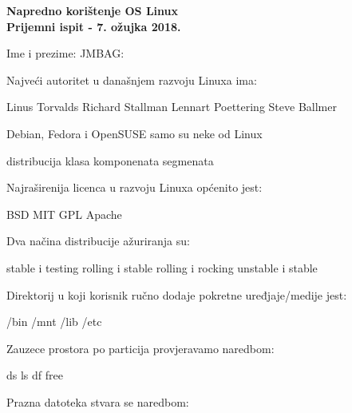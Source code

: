 \documentclass[a4paper,11pt]{exam}
\begin{document}
\firstpageheader
	{}
	{{\large \textbf{Napredno korištenje OS Linux}}\\
		\textbf{Prijemni ispit - 7. ožujka 2018.}}
	{}
\footer
	{}{}{\thepage}
	
Ime i prezime: \fillin[][7cm] \hfill JMBAG: \fillin[][5cm]\\

\begin{questions}
	\question
	Najveći autoritet u današnjem razvoju Linuxa ima:
	
	\begin{oneparchoices}
		\choice Linus Torvalds
		\choice Richard Stallman
		\choice Lennart Poettering
		\choice Steve Ballmer
	\end{oneparchoices}
	
	\question
	Debian, Fedora i OpenSUSE samo su neke od Linux
	
	\begin{oneparchoices}
		\choice distribucija
		\choice klasa
		\choice komponenata
		\choice segmenata
	\end{oneparchoices}
	
	\question
	Najraširenija licenca u razvoju Linuxa općenito jest:
	
	\begin{oneparchoices}
		\choice BSD
		\choice MIT
		\choice GPL
		\choice Apache
	\end{oneparchoices}
	
	\question
  Dva načina distribucije ažuriranja su: 

	\begin{oneparchoices}
		    \choice stable i testing
        \choice rolling i stable 
        \choice rolling i rocking
        \choice unstable i stable
	\end{oneparchoices}

	\question
  Direktorij u koji korisnik ručno dodaje pokretne uređjaje/medije jest:
	
	\begin{oneparchoices}
        \choice /bin
        \choice /mnt
        \choice /lib
        \choice /etc
	\end{oneparchoices}
	
	\question
Zauzece prostora po particija provjeravamo naredbom:
	
	\begin{oneparchoices}
		\choice ds 
		\choice ls 
		\choice df 
		\choice free
	\end{oneparchoices}
	
	\question
  Prazna datoteka stvara se naredbom:


\end{questions}
\end{document}
